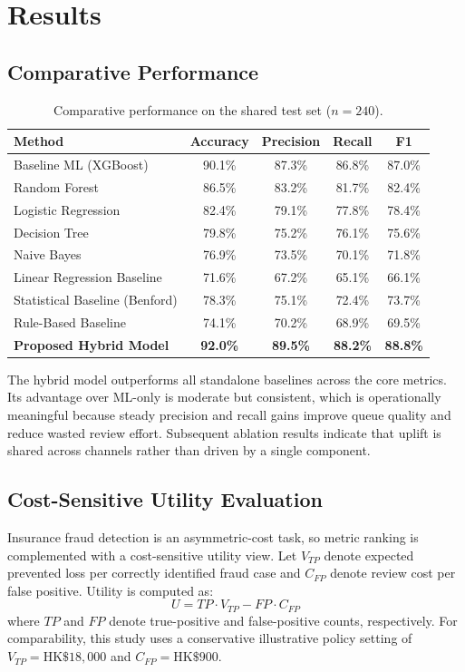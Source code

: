\documentclass[12pt,a4paper]{report}
\begin{document}
\chapter{Results}

\section{Comparative Performance}
\begin{table}[H]
\caption{Comparative performance on the shared test set ($n=240$).}
\label{tab:performance}
\begin{tabular}{lcccc}
\toprule
\textbf{Method} & \textbf{Accuracy} & \textbf{Precision} & \textbf{Recall} & \textbf{F1} \\
\midrule
Baseline ML (XGBoost) & 90.1\% & 87.3\% & 86.8\% & 87.0\% \\
Random Forest & 86.5\% & 83.2\% & 81.7\% & 82.4\% \\
Logistic Regression & 82.4\% & 79.1\% & 77.8\% & 78.4\% \\
Decision Tree & 79.8\% & 75.2\% & 76.1\% & 75.6\% \\
Naive Bayes & 76.9\% & 73.5\% & 70.1\% & 71.8\% \\
Linear Regression Baseline & 71.6\% & 67.2\% & 65.1\% & 66.1\% \\
Statistical Baseline (Benford) & 78.3\% & 75.1\% & 72.4\% & 73.7\% \\
Rule-Based Baseline & 74.1\% & 70.2\% & 68.9\% & 69.5\% \\
\textbf{Proposed Hybrid Model} & \textbf{92.0\%} & \textbf{89.5\%} & \textbf{88.2\%} & \textbf{88.8\%} \\
\bottomrule
\end{tabular}
\end{table}

The hybrid model outperforms all standalone baselines across the core metrics. Its advantage over ML-only is moderate but consistent, which is operationally meaningful because steady precision and recall gains improve queue quality and reduce wasted review effort. Subsequent ablation results indicate that uplift is shared across channels rather than driven by a single component.

\section{Cost-Sensitive Utility Evaluation}
Insurance fraud detection is an asymmetric-cost task, so metric ranking is complemented with a cost-sensitive utility view. Let $V_{TP}$ denote expected prevented loss per correctly identified fraud case and $C_{FP}$ denote review cost per false positive. Utility is computed as:
\begin{equation}
U = TP\cdot V_{TP} - FP\cdot C_{FP}
\end{equation}
where $TP$ and $FP$ denote true-positive and false-positive counts, respectively.
For comparability, this study uses a conservative illustrative policy setting of $V_{TP}=\text{HK\$}18{,}000$ and $C_{FP}=\text{HK\$}900$.
\end{document}
